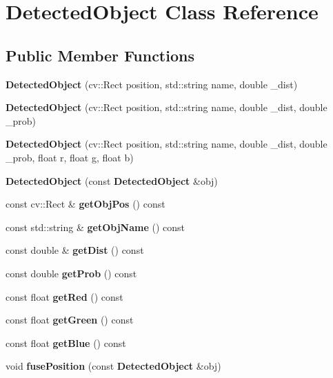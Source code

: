 \section{Detected\+Object Class Reference}
\label{class_detected_object}
\subsection*{Public Member Functions}
\begin{DoxyCompactItemize}
\item 
\mbox{\label{class_detected_object_ac0739bdcb2ce2667689c0ba51d468a06}} 
{\bfseries Detected\+Object} (cv\+::\+Rect position, std\+::string name, double \+\_\+dist)
\item 
\mbox{\label{class_detected_object_aa146b28c06cbb765bcc91eaab4dc5779}} 
{\bfseries Detected\+Object} (cv\+::\+Rect position, std\+::string name, double \+\_\+dist, double \+\_\+prob)
\item 
\mbox{\label{class_detected_object_ad0e1af3fc53fc20bd6dd683aeba5d381}} 
{\bfseries Detected\+Object} (cv\+::\+Rect position, std\+::string name, double \+\_\+dist, double \+\_\+prob, float r, float g, float b)
\item 
\mbox{\label{class_detected_object_a76a07a96600d2c887567a6ce0467b6c0}} 
{\bfseries Detected\+Object} (const \textbf{ Detected\+Object} \&obj)
\item 
\mbox{\label{class_detected_object_a90f4ef671b48ae8f4d48aee61f20e03b}} 
const cv\+::\+Rect \& {\bfseries get\+Obj\+Pos} () const
\item 
\mbox{\label{class_detected_object_a7ddbb811f9c986fe38e2993b0ffb751d}} 
const std\+::string \& {\bfseries get\+Obj\+Name} () const
\item 
\mbox{\label{class_detected_object_a3e72ea4cf7d0d466a8cb117b914ebb3a}} 
const double \& {\bfseries get\+Dist} () const
\item 
\mbox{\label{class_detected_object_a8fd5a4c683876ff0c9b0a2842132aff1}} 
const double {\bfseries get\+Prob} () const
\item 
\mbox{\label{class_detected_object_aae31024c46b148c9209680b0aa4ae5f1}} 
const float {\bfseries get\+Red} () const
\item 
\mbox{\label{class_detected_object_a29ef493dd383255ffc2e742828533b2d}} 
const float {\bfseries get\+Green} () const
\item 
\mbox{\label{class_detected_object_a551abb9b51b4e7631d5a571fee65c212}} 
const float {\bfseries get\+Blue} () const
\item 
\mbox{\label{class_detected_object_a7c9880948e0111fd319a62306e651427}} 
void {\bfseries fuse\+Position} (const \textbf{ Detected\+Object} \&obj)
\end{DoxyCompactItemize}
